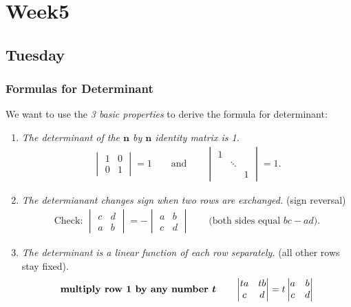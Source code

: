 
\chapter{Week5}

\section{Tuesday}
\subsection{Formulas for Determinant}
We want to use the \emph{3 basic properties} to derive the formula for determinant:
\begin{enumerate}
\item
\emph{The determinant of the $\bm n$ by $\bm n$ identity matrix is 1.}
\begin{gather*}
\begin{vmatrix}1&0\\0&1\end{vmatrix}=1\qquad\text{and}\qquad\begin{vmatrix}
1&&\\&\ddots&\\&&1\end{vmatrix}=1.
\end{gather*}
\item
\emph{The determianant changes sign when two rows are exchanged.} (sign reversal)
\begin{gather*}
\text{Check:   }\begin{vmatrix}c&d\\a&b\end{vmatrix}=-\begin{vmatrix}a&b\\c&d\end{vmatrix}\qquad\text{(both sides equal $bc-ad$)}.
\end{gather*}
\item
\emph{The determinant is a linear function of each row separately.} (all other rows stay fixed).
\begin{gather*}
\text{\emph{multiply row 1 by any number $\bm t$}}\qquad\begin{vmatrix}ta&tb\\c&d\end{vmatrix}=t\begin{vmatrix}a&b\\c&d\end{vmatrix}

\end{gather*}
\end{enumerate}
